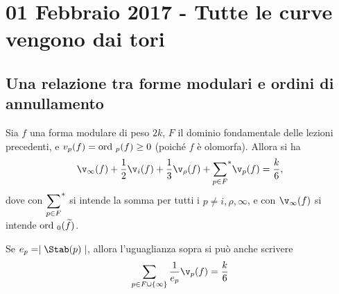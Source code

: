 \chapter{01 Febbraio 2017 - Tutte le curve vengono dai tori}

\section{Una relazione tra forme modulari e ordini di annullamento}

\begin{teorema}
	Sia $f$ una forma modulare di peso $2k$, $F$ il dominio fondamentale delle lezioni precedenti,
	e $v_p(f)=\text{ord }_p(f)\geq0$ (poiché $f$ è olomorfa). Allora si ha
	\begin{equation*}
	\v_\infty(f)+\frac{1}{2}\v_i(f)+\frac{1}{3}\v_{\rho}(f)+{\sum_{p\in F}}^{*}\v_p(f)=\frac{k}{6},
	\end{equation*}
	dove con $\displaystyle {\sum_{p\in F}}^{*}$ si intende la somma per tutti i $p \neq i, \rho, \infty$,
	e con $\v_\infty(f)$ si intende $\text{ord }_0(\widetilde{f})$.
	
	Se $e_p=\abs{\Stab(p)}$, allora l'uguaglianza sopra si può anche scrivere
	\begin{equation*}
		\sum_{p\in F \cup \{\infty\}} \frac{1}{e_p}\v_p(f)=\frac{k}{6}
	\end{equation*}
\end{teorema}

